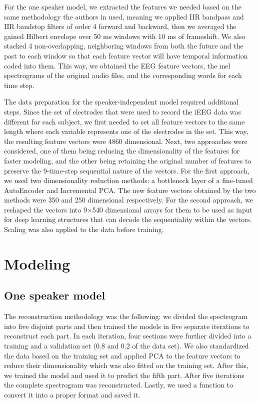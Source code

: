 \documentclass{article}
\begin{document}
For the one speaker model, we extracted the features we needed based on the same methodology the authors in \cite{dataset} used, meaning we applied IIR bandpass and IIR bandstop filters of order 4 forward and backward, then we averaged the gained Hilbert envelope over 50 ms windows with 10 ms of frameshift. We also stacked 4 non-overlapping, neighboring windows from both the future and the past to each window so that each feature vector will have temporal information coded into them. This way, we obtained the EEG feature vectors, the mel spectrograms of the original audio files, and the corresponding words for each time step.

The data preparation for the speaker-independent model required additional steps. Since the set of electrodes that were used to record the iEEG data was different for each subject, we first needed to set all feature vectors to the same length where each variable represents one of the electrodes in the set. This way, the resulting feature vectors were 4860 dimensional.
Next, two approaches were considered, one of them being reducing the dimensionality of the features for faster modeling, and the other being retaining the original number of features to preserve the 9-time-step sequential nature of the vectors. For the first approach, we used two dimensionality reduction methods: a bottleneck layer of a fine-tuned AutoEncoder and Incremental PCA. The new feature vectors obtained by the two methods were 350 and 250 dimensional respectively. For the second approach, we reshaped the vectors into 9$\times$540 dimensional arrays for them to be used as input for deep learning structures that can decode the sequentiality within the vectors. Scaling was also applied to the data before training.


\section{Modeling}

\subsection{One speaker model}

The reconstruction methodology was the following: we divided the spectrogram into five disjoint parts and then trained the models in five separate iterations to reconstruct each part. In each iteration, four sections were further divided into a training and a validation set (0.8 and 0.2 of the data set). We also standardized the data based on the training set and applied PCA to the feature vectors to reduce their dimensionality which was also fitted on the training set. After this, we trained the model and used it to predict the fifth part. After five iterations the complete spectrogram was reconstructed. Lastly, we used a function to convert it into a proper format and saved it.
\end{document}
